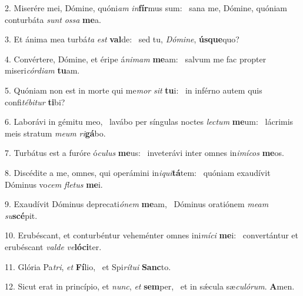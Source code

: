 2. Miserére mei, Dómine, quóni\textit{am} \textit{in}\textbf{fír}mus sum: \ast\  sana me, Dómine, quóniam conturbáta \textit{sunt} \textit{os}\textit{sa} \textbf{me}a.\

3. Et ánima mea turbá\textit{ta} \textit{est} \textbf{val}de: \ast\  sed tu, \textit{Dó}\textit{mi}\textit{ne}, \textbf{ús}\textbf{que}quo?\

4. Convértere, Dómine, et éripe á\textit{ni}\textit{mam} \textbf{me}am: \ast\  salvum me fac propter miseri\textit{cór}\textit{di}\textit{am} \textbf{tu}am.\

5. Quóniam non est in morte qui me\textit{mor} \textit{sit} \textbf{tu}i: \ast\  in inférno autem quis confi\textit{té}\textit{bi}\textit{tur} \textbf{ti}bi?\

6. Laborávi in gémitu meo, \dag\  lavábo per síngulas noctes \textit{lec}\textit{tum} \textbf{me}um: \ast\  lácrimis meis stratum \textit{me}\textit{um} \textit{ri}\textbf{gá}bo.\

7. Turbátus est a furóre ó\textit{cu}\textit{lus} \textbf{me}us: \ast\  inveterávi inter omnes in\textit{i}\textit{mí}\textit{cos} \textbf{me}os.\

8. Discédite a me, omnes, qui operámini in\textit{i}\textit{qui}\textbf{tá}tem: \ast\  quóniam exaudívit Dóminus vo\textit{cem} \textit{fle}\textit{tus} \textbf{me}i.\

9. Exaudívit Dóminus deprecati\textit{ó}\textit{nem} \textbf{me}am, \ast\  Dóminus oratiónem \textit{me}\textit{am} \textit{su}\textbf{scé}pit.\

10. Erubéscant, et conturbéntur veheménter omnes ini\textit{mí}\textit{ci} \textbf{me}i: \ast\  convertántur et erubéscant \textit{val}\textit{de} \textit{ve}\textbf{ló}\textbf{ci}ter.\

11. Glória Pa\textit{tri}, \textit{et} \textbf{Fí}lio, \ast\  et Spi\textit{rí}\textit{tu}\textit{i} \textbf{Sanc}to.\

12. Sicut erat in princípio, et \textit{nunc}, \textit{et} \textbf{sem}per, \ast\  et in sǽcula sæ\textit{cu}\textit{ló}\textit{rum}. \textbf{A}men.\

